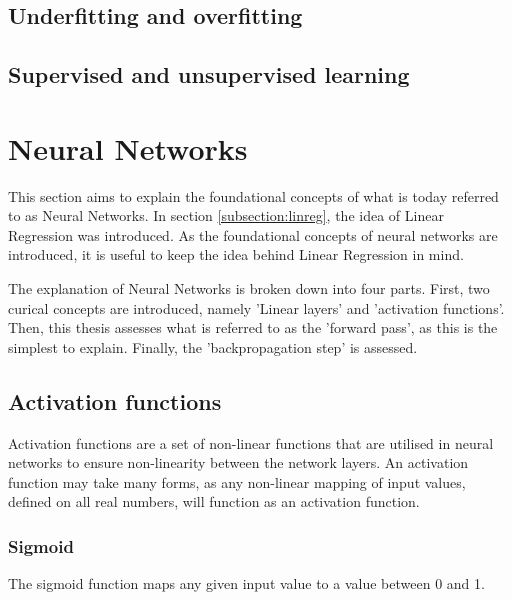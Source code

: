 \subsection{Underfitting and overfitting}

\subsection{Supervised and unsupervised learning}




\section{Neural Networks}




This section aims to explain the foundational concepts of what is today referred to as Neural Networks.
In section \ref{subsection:linreg}, the idea of Linear Regression was introduced.
As the foundational concepts of neural networks are introduced, it is useful to keep the idea behind Linear Regression in mind.

The explanation of Neural Networks is broken down into four parts. 
First, two curical concepts are introduced, namely 'Linear layers' and 'activation functions'. 
Then, this thesis assesses what is referred to as the 'forward pass', as this is the simplest to explain.
Finally, the 'backpropagation step' is assessed.




\subsection{Activation functions}
\label{subsection:activationFunctions}


Activation functions are a set of non-linear functions that are utilised in neural networks to ensure non-linearity between the network layers.
An activation function may take many forms, as any non-linear mapping of input values, defined on all real numbers, will function as an activation function.



\subsubsection{Sigmoid}

The sigmoid function maps any given input value to a value between 0 and 1. 




